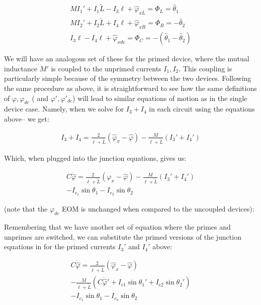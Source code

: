 \documentclass[paper=a4, twocolumn, fontsize=10pt]{article} %
\numberwithin{equation}{section} %
\numberwithin{figure}{section} %
\numberwithin{table}{section} %
\def \df#1{\hat{#1}}
\def \dl#1{#1}
\begin{document}
\begin{align}
    MI_1' + I_1 \tilde{L} - I_3 \ell + \df\varphi_{xL} = \Phi_{L} = \df\theta_1
    \\
    MI_2' + I_2 \tilde{L} + I_4 \ell + \df\varphi_{xR} = \Phi_{R} = -\df\theta_2
    \\
    I_3 \ell - I_4 \ell + \df\varphi_{xdc} = \Phi_{C} = -(\df\theta_1 - \df\theta_2)
\end{align} 

We will have an analogous set of these for the primed device, where the mutual inductance $M'$ is coupled to the unprimed currents $I_1, I_2$. This coupling is particularly simple because of the symmetry between the two devices. Following the same procedure as above, it is straightforward to see how the same definitions of $\dl\varphi,\dl\varphi_{dc}$ ( and $\dl\varphi',\dl\varphi'_{dc}$) will lead to similar equations of motion as in the single device case. Namely, when we solve for $I_3+I_4$ in each circuit using the equations above-- we get:

\begin{align}
I_3 + I_4 = \frac{2}{\ell+\tilde{L}}\left(\df\varphi_x - \df\varphi \right) - \frac{M}{\ell+\tilde{L}} (I_3'+I_4')
\end{align}

Which, when plugged into the junction equations, gives us:

\begin{multline}
    C \ddot{\df\varphi} = \frac{2}{\ell+\tilde{L}}\left( \df\varphi_x - \df\varphi \right) - \frac{M}{\ell+\tilde{L}} (I_3'+I_4') \\ - I_{c_1} \sin \dl\theta_1 - I_{c_2} \sin \dl\theta_2
\end{multline}

(note that the $\dl\varphi_{dc}$ EOM is unchanged when compared to the uncoupled devices):

Remembering that we have another set of equation where the primes and unprimes are switched, we can substitute the primed versions of the junction equations in for the primed currents $I_3'$ and $I_4'$ above:

\begin{multline}
    C \ddot{\df\varphi} = \frac{2}{\ell+\tilde{L}}\left( \df\varphi_x - \df\varphi \right) \\ - \frac{M}{\ell+\tilde{L}} ( C\ddot{\df\varphi}' + I_{c1}\sin \theta_1' + I_{c2} \sin \theta_2') \\ - I_{c_1} \sin \theta_1 - I_{c_2} \sin \theta_2
\end{multline}
\end{document}
